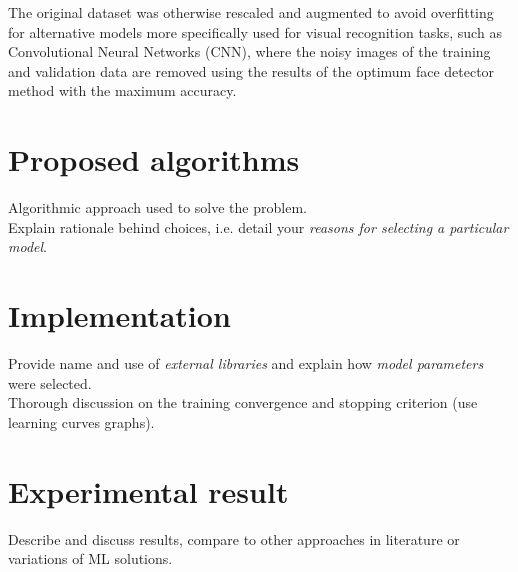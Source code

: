 \documentclass[conference]{IEEEtran}
\begin{document}
The original dataset was otherwise rescaled and augmented to avoid overfitting for alternative models more specifically used for visual recognition tasks, such as Convolutional Neural Networks (CNN), where the noisy images of the training and validation data are removed using the results of the optimum face detector method with the maximum accuracy. %

\section{Proposed algorithms} \label{s-algorithms}

Algorithmic approach used to solve the problem.\\



Explain rationale behind choices, i.e. detail your \textit{reasons for selecting a particular model}.\\


\section{Implementation} \label{s-implement}

Provide name and use of \textit{external libraries} and explain how \textit{model parameters} were selected.\\



Thorough discussion on the training convergence and stopping criterion (use learning curves graphs).\\

\section{Experimental result} \label{s-exp-res}

Describe and discuss results, compare to other approaches in literature or variations of ML solutions.\\
\end{document}

